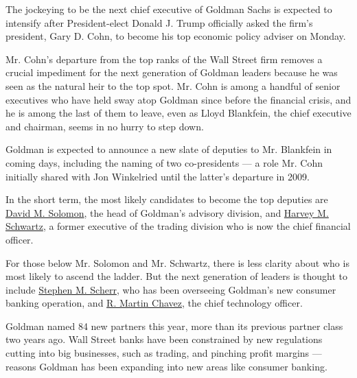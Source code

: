 The jockeying to be the next chief executive of Goldman Sachs is
expected to intensify after President-elect Donald J. Trump officially
asked the firm's president, Gary D. Cohn, to become his top economic
policy adviser on Monday.

Mr. Cohn's departure from the top ranks of the Wall Street firm removes
a crucial impediment for the next generation of Goldman leaders because
he was seen as the natural heir to the top spot. Mr. Cohn is among a
handful of senior executives who have held sway atop Goldman since
before the financial crisis, and he is among the last of them to leave,
even as Lloyd Blankfein, the chief executive and chairman, seems in no
hurry to step down.

Goldman is expected to announce a new slate of deputies to Mr. Blankfein
in coming days, including the naming of two co-presidents --- a role Mr.
Cohn initially shared with Jon Winkelried until the latter's departure
in 2009.

In the short term, the most likely candidates to become the top deputies
are
\href{http://www.goldmansachs.com/who-we-are/leadership/management-committee/david-m-solomon.html}{David
M. Solomon}, the head of Goldman's advisory division, and
\href{http://www.goldmansachs.com/who-we-are/leadership/executive-officers/harvey-m-schwartz.html}{Harvey
M. Schwartz}, a former executive of the trading division who is now the
chief financial officer.

For those below Mr. Solomon and Mr. Schwartz, there is less clarity
about who is most likely to ascend the ladder. But the next generation
of leaders is thought to include
\href{http://www.goldmansachs.com/who-we-are/leadership/management-committee/stephen-m-scherr.html}{Stephen
M. Scherr}, who has been overseeing Goldman's new consumer banking
operation, and
\href{http://www.goldmansachs.com/who-we-are/leadership/management-committee/r-martin-chavez.html}{R.
Martin Chavez}, the chief technology officer.

Goldman named 84 new partners this year, more than its previous partner
class two years ago. Wall Street banks have been constrained by new
regulations cutting into big businesses, such as trading, and pinching
profit margins --- reasons Goldman has been expanding into new areas
like consumer banking.

